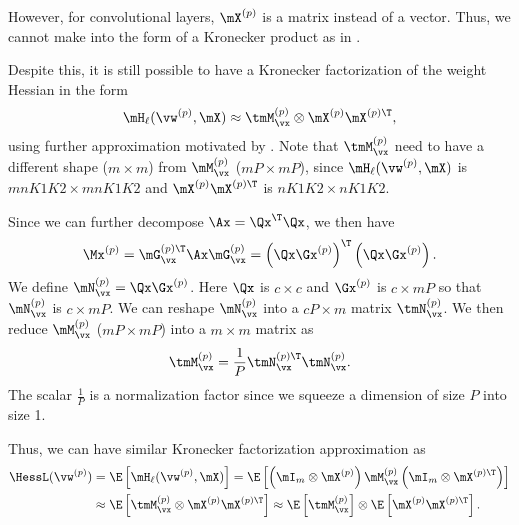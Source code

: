 However, for convolutional layers, $\mX^{(p)}$ is a matrix instead of a vector. Thus, we cannot make  into the form of a Kronecker product as in .

Despite this, it is still possible to have a Kronecker factorization of the weight Hessian in the form
\begin{equation}
   \mH_\ell(\vw^{(p)}, \mX) \approx \tmM^{(p)}_\vx \otimes \mX^{(p)}\mX^{(p)\T},
\end{equation}
using further approximation motivated by \cite{grosse2016kronecker}.
Note that $\tmM^{(p)}_\vx$ need to have a different shape ($m\times m$) from $\mM^{(p)}_\vx$ ($mP\times mP$), since $\mH_\ell(\vw^{(p)},\mX)$ is $mnK1K2 \times mnK1K2$ and $\mX^{(p)}\mX^{(p)\T}$ is $nK1K2 \times nK1K2$.

Since we can further decompose $\Ax = \Qx^\T\Qx$, we then have
\begin{equation}
    \Mx^{(p)} = \mG_\vx^{(p)\T}\Ax\mG_\vx^{(p)} = \left(\Qx\Gx^{(p)}\right)^\T\left(\Qx\Gx^{(p)}\right).
\end{equation}
We define $\mN_\vx^{(p)} =\Qx\Gx^{(p)}$. Here $\Qx$ is $c\times c$ and $\Gx^{(p)}$ is $c\times mP$ so that $\mN_\vx^{(p)}$ is $c \times mP$. We can reshape $\mN_\vx^{(p)}$ into a $cP\times m$ matrix $\tmN_\vx^{(p)}$. We then reduce $\mM^{(p)}_\vx$ ($mP\times mP$) into a $m\times m$ matrix as 
\begin{equation}
    \tmM^{(p)}_\vx = \frac{1}{P}\tmN_\vx^{(p)\T}\tmN_\vx^{(p)}.
\end{equation}
The scalar $\frac{1}{P}$ is a normalization factor since we squeeze a dimension of size $P$ into size 1.

Thus, we can have similar Kronecker factorization approximation as
\begin{align}
    \HessL(\vw^{(p)}) &= \E\left[\mH_\ell(\vw^{(p)}, \mX)\right] = 
    \E\left[\left(\mI_{m} \otimes \mX^{(p)}\right)\mM_\vx^{(p)}\left(\mI_{m} \otimes \mX^{(p)\T}\right)\right] \\ &\approx \E\left[\tmM^{(p)}_\vx \otimes \mX^{(p)}\mX^{(p)\T}\right] \approx \E\left[\tmM^{(p)}_\vx\right] \otimes \E\left[\mX^{(p)}\mX^{(p)\T}\right].
\end{align}